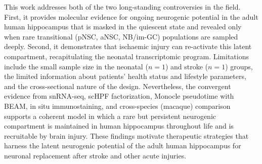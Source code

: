 \documentclass[11pt]{article}
\begin{document}
This work addresses both of the two long-standing controversies in the field. First, it provides molecular evidence for ongoing neurogenic potential in the adult human hippocampus that is masked in the quiescent state and revealed only when rare transitional (pNSC, aNSC, NB/im-GC) populations are sampled deeply. Second, it demonstrates that ischaemic injury can re-activate this latent compartment, recapitulating the neonatal transcriptomic program. Limitations include the small sample size in the neonatal ($n = 1$) and stroke ($n = 1$) groups, the limited information about patients' health status and lifestyle parameters, and the cross-sectional nature of the design. Nevertheless, the convergent evidence from snRNA-seq, scHPF factorization, Monocle pseudotime with BEAM, in situ immunostaining, and cross-species (macaque) comparison supports a coherent model in which a rare but persistent neurogenic compartment is maintained in human hippocampus throughout life and is recruitable by brain injury. These findings motivate therapeutic strategies that harness the latent neurogenic potential of the adult human hippocampus for neuronal replacement after stroke and other acute injuries.



\end{document}
